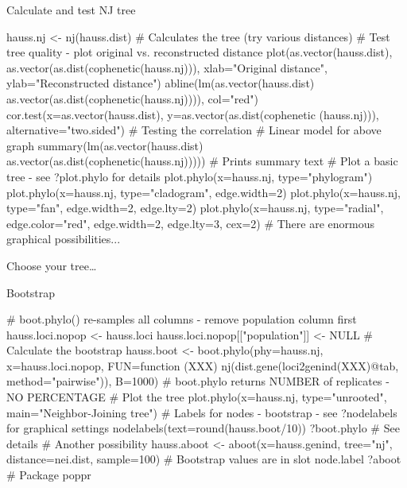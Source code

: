 \documentclass[compress, xelatex, 11pt, xcolor=svgnames, aspectratio=169,
	hyperref={
		bookmarks=true,
		unicode=true,
		colorlinks=true,
		pdftitle={Molecular data in R},
		plainpages=false,
		pdfauthor={Vojtech Zeisek},
		pdfsubject={Course about phylogeny and evolution in R},
		pdfcreator={XeLaTeX},
		pdfkeywords={R, evolution, phylogeny, molecular data},
		linkcolor=Crimson, %
		anchorcolor=Magenta, %
		citecolor=Magenta, %
		filecolor=Magenta, %
		menucolor=Magenta, %
		urlcolor=DodgerBlue, %
		},
	url={hyphens, lowtilde} %
	]{beamer}
\renewcommand{\texttt}[1]{\colorbox{Beige}{{\ttfamily #1}}}
\begin{document}
\begin{frame}[fragile]{Calculate and test NJ tree}
	\begin{spluscode}
    hauss.nj <- nj(hauss.dist) # Calculates the tree (try various distances)
    # Test tree quality - plot original vs. reconstructed distance
    plot(as.vector(hauss.dist), as.vector(as.dist(cophenetic(hauss.nj))),
      xlab="Original distance", ylab="Reconstructed distance")
    abline(lm(as.vector(hauss.dist) ~
      as.vector(as.dist(cophenetic(hauss.nj)))), col="red")
    cor.test(x=as.vector(hauss.dist), y=as.vector(as.dist(cophenetic
      (hauss.nj))), alternative="two.sided") # Testing the correlation
    # Linear model for above graph
    summary(lm(as.vector(hauss.dist) ~
      as.vector(as.dist(cophenetic(hauss.nj))))) # Prints summary text
    # Plot a basic tree - see ?plot.phylo for details
    plot.phylo(x=hauss.nj, type="phylogram")
    plot.phylo(x=hauss.nj, type="cladogram", edge.width=2)
    plot.phylo(x=hauss.nj, type="fan", edge.width=2, edge.lty=2)
    plot.phylo(x=hauss.nj, type="radial", edge.color="red", edge.width=2,
      edge.lty=3, cex=2) # There are enormous graphical possibilities...
	\end{spluscode}
\end{frame}

\begin{frame}{Choose your tree\ldots}
	\begin{center}
		\texttt{[image: nj1.png]}
	\end{center}
\end{frame}

\begin{frame}[fragile]{Bootstrap}
	\begin{spluscode}
    # boot.phylo() re-samples all columns - remove population column first
    hauss.loci.nopop <- hauss.loci
    hauss.loci.nopop[["population"]] <- NULL
    # Calculate the bootstrap
    hauss.boot <- boot.phylo(phy=hauss.nj, x=hauss.loci.nopop, FUN=function
      (XXX) nj(dist.gene(loci2genind(XXX)@tab, method="pairwise")), B=1000)
    # boot.phylo returns NUMBER of replicates - NO PERCENTAGE
    # Plot the tree
    plot.phylo(x=hauss.nj, type="unrooted", main="Neighbor-Joining tree")
    # Labels for nodes - bootstrap - see ?nodelabels for graphical settings
    nodelabels(text=round(hauss.boot/10))
    ?boot.phylo # See details
    # Another possibility
    hauss.aboot <- aboot(x=hauss.genind, tree="nj", distance=nei.dist,
      sample=100) # Bootstrap values are in slot node.label
    ?aboot # Package poppr
	\end{spluscode}
\end{frame}
\end{document}
